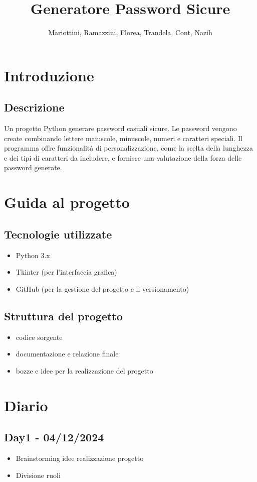 \documentclass[twocolumn]{article}
\title{Generatore Password Sicure}
\author{Mariottini, Ramazzini, Florea, Trandela, Cont, Nazih}
\date{}
\begin{document}
\maketitle

\section{Introduzione}

    \subsection{Descrizione}

        Un progetto Python generare password casuali sicure. Le password vengono create combinando lettere maiuscole, minuscole, numeri e caratteri speciali. Il programma offre funzionalità di personalizzazione, come la scelta della lunghezza e dei tipi di caratteri da includere, e fornisce una valutazione della forza delle password generate.

\section{Guida al progetto}

    \subsection{Tecnologie utilizzate}

        \begin{itemize}            
            \item Python 3.x
            \item Tkinter (per l'interfaccia grafica)
            \item GitHub (per la gestione del progetto e il versionamento)
        \end{itemize}

    \subsection{Struttura del progetto}

        \begin{itemize}
            \item {} codice sorgente
            \item {} documentazione e relazione finale
            \item {} bozze e idee per la realizzazione del progetto
        \end{itemize}

\section{Diario}

    \subsection{Day1 - 04/12/2024}
        \begin{itemize}
            \item Brainstorming idee realizzazione progetto
            \item Divisione ruoli
        \end{itemize}
\end{document}
